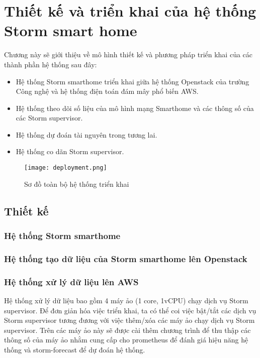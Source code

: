 
\chapter{Thiết kế và triển khai của hệ thống Storm smart home}

Chương này sẽ giới thiệu về mô hình thiết kế và phương pháp triển khai của các thành phần hệ thống sau đây:
\begin{itemize}
    \item Hệ thống Storm smarthome triển khai giữa hệ thống Openstack của trường Công nghệ và hệ thống điện toán đám mây phổ biến AWS.
    \item Hệ thống theo dõi số liệu của mô hình mạng Smarthome và các thông số của các Storm supervisor.
    \item Hệ thống dự đoán tài nguyên trong tương lai.
    \item Hệ thống co dãn Storm supervisor.
\end{itemize}

\begin{figure}
    \texttt{[image: deployment.png]}
    \caption{Sơ đồ toàn bộ hệ thống triển khai}
    \label{}
\end{figure}

\section{Thiết kế}

\subsection{Hệ thống Storm smarthome}

\subsection{Hệ thống tạo dữ liệu của Storm smarthome lên Openstack}

\subsection{Hệ thống xử lý dữ liệu lên AWS}
Hệ thống xử lý dữ liệu bao gồm 4 máy ảo (1 core, 1vCPU) chạy dịch vụ Storm supervisor. Để đơn giản hóa việc triển khai, ta có thể coi việc bật/tắt các dịch vụ Storm supervisor tương đương với việc thêm/xóa các máy ảo chạy dịch vụ Storm supervisor.
Trên các máy ảo này sẽ được cài thêm chương trình \autocite{node-exporter} để thu thập các thông số của máy ảo nhằm cung cấp cho prometheus để đánh giá hiệu năng hệ thống và storm-forecast để dự đoán hệ thống.

